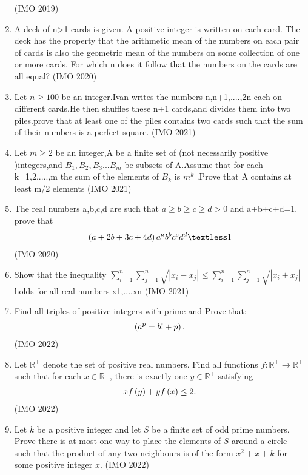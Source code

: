 \begin{enumerate}
\begin{enumerate}
\end{enumerate}
\hfill(IMO 2019)
\item A deck of n\textgreater1 cards is given. A positive integer is written on each card. The deck
has the property that the arithmetic mean of the numbers on each pair of cards is also the geometric
mean of the numbers on some collection of one or more cards.
For which n does it follow that the numbers on the cards are all equal?
\hfill(IMO 2020)
\item Let $ n\geq 100$ be an integer.Ivan writes the numbers n,n+1,....,2n each on different cards.He then shuffles these n+1 cards,and divides them into two piles.prove that at least one of the piles contains two cards such that the sum of their numbers is a perfect square.
\hfill(IMO 2021)
\item Let $ m \geq 2$ be an integer,A be a finite set of (not necessarily positive )integers,and $B_{1},B_{2},B_{3}...B_{m}$ be subsets of A.Assume that for each k=1,2,....,m the sum of the elements of $B_{k}$ is $m^k$ .Prove that A contains at least m/2 elements
\hfill(IMO 2021)
\item The real numbers a,b,c,d are such that  $a\geq b\geq c\geq d>0$ and a+b+c+d=1. prove that
\begin{align}
    \brak {a+2b+3c+4d}a^a b^b c^c d^d \textless 1
\end{align}
\hfill(IMO 2020)
\item Show that the inequality
$\sum_{i=1}^{n}\sum_{j=1}^{n}\sqrt{|x_{i}-x_{j}|}\le\sum_{i=1}^{n}\sum_{j=1}^{n}\sqrt{|x_{i}+x_{j}|}$
holds for all real numbers x1,....xn
\hfill(IMO 2021)
\item
Find all triples   of positive integers with   prime and Prove that: 
\begin{align}
\left( a^{p} = b! + p \right).
\end{align} \hfill(IMO 2022)
\item
Let \( \mathbb{R}^{+} \) denote the set of positive real numbers. Find all functions \( f: \mathbb{R}^{+} \to \mathbb{R}^{+} \) such that for each \( x \in \mathbb{R}^{+} \), there is exactly one \( y \in \mathbb{R}^{+} \) satisfying \\ 
\begin{align} xf\left(y\right) + y f\left(x\right) \leq 2.\end{align}
\hfill(IMO 2022)
\item
Let  $k$  be a positive integer and let  $S$  be a finite set of odd prime numbers. Prove there is at most one way  to place the elements of  $S$  around a circle such that the product of any two neighbours is of the form  $x^{2} + x + k$  for some positive integer  $x$. \hfill(IMO 2022)

\end{enumerate}
